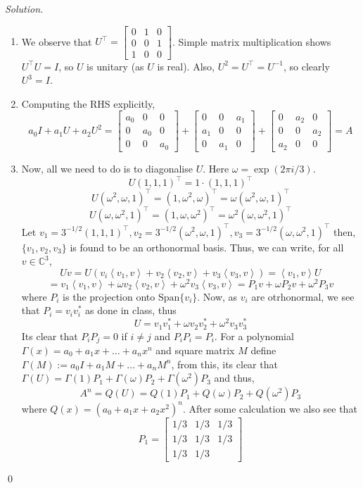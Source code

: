 \documentclass[12pt,a4paper]{article}
\newenvironment{solution}{%
  \par\noindent\textit{Solution.}\ }{\qed}
\theoremstyle{problemstyle}
\def\bC{\mathbb{C}}
\newcommand{\ipp}[1]{{\left\langle{#1}\right\rangle}}
\begin{document}
\begin{solution}
\begin{enumerate}[label=(\roman*)]
\item We observe that $U^\top=\begin{bmatrix}0&1&0\\ 0&0&1\\ 1&0&0\end{bmatrix}$. Simple matrix multiplication shows $U^\top U=I$, so $U$ is unitary (as $U$ is real). Also, $U^2=U^\top=U^{-1}$, so clearly $U^3=I$.
\item Computing the RHS explicitly,
$$a_0I+a_1U+a_2U^2=\begin{bmatrix}a_0&0&0\\ 0&a_0&0\\ 0&0&a_0\end{bmatrix}+\begin{bmatrix}0&0&a_1\\ a_1&0&0\\ 0&a_1&0\end{bmatrix}+\begin{bmatrix}0&a_2&0\\ 0&0&a_2\\ a_2&0&0\end{bmatrix}=A$$
\item Now, all we need to do is to diagonalise $U$. Here $\omega=\exp(2\pi i/3)$.
$$U(1,1,1)^\top=1\cdot(1,1,1)^\top$$
$$U(\omega^2,\omega,1)^\top=(1,\omega^2,\omega)^\top=\omega(\omega^2,\omega,1)^\top$$
$$U(\omega,\omega^2,1)^\top=(1,\omega,\omega^2)^\top=\omega^2(\omega,\omega^2,1)^\top$$
Let $v_1=3^{-1/2}(1,1,1)^\top, v_2=3^{-1/2}(\omega^2,\omega,1)^\top, v_3=3^{-1/2}(\omega,\omega^2,1)^\top$ then, $\{v_1,v_2,v_3\}$ is found to be an orthonormal basis. Thus, we can write, for all $v\in\bC^3$,
$$Uv=U(v_i\ipp{v_1,v}+v_2\ipp{v_2,v}+v_3\ipp{v_3,v})=\ipp{v_1,v}U$$
$$=v_1\ipp{v_1,v}+\omega v_2\ipp{v_2,v}+\omega^2 v_3\ipp{v_3,v}=P_1v+\omega
P_2v+\omega^2 P_3v$$
where $P_i$ is the projection onto $\text{Span}\{v_i\}$. Now, as $v_i$ are
otrhonormal, we see that $P_i=v_iv_i^*$ as done in class, thus
$$U=v_1v_1^*+\omega v_2v_2^*+\omega^2 v_3v_3^*$$
Its clear that $P_iP_j=0$ if $i\neq j$ and $P_iP_i=P_i$. For a polynomial
$\Gamma(x)=a_0+a_1x+\ldots+a_nx^n$ and square matrix $M$ define
$\Gamma(M):=a_0I+a_1M+\ldots+a_nM^n$, from this, its clear that
$\Gamma(U)=\Gamma(1)P_1+\Gamma(\omega)P_2+\Gamma(\omega^2)P_3$ and thus,
$$A^n=Q(U)=Q(1)P_1+Q(\omega)P_2+Q(\omega^2)P_3$$
where $Q(x)=(a_0+a_1x+a_2x^2)^n$. After some calculation we also see that
$$P_1=\begin{bmatrix}1/3 & 1/3 & 1/3\\ 1/3 & 1/3 & 1/3\\ 1/3 & 1/3 &

\end{bmatrix}$$
\end{enumerate}
\end{solution}
\end{document}
